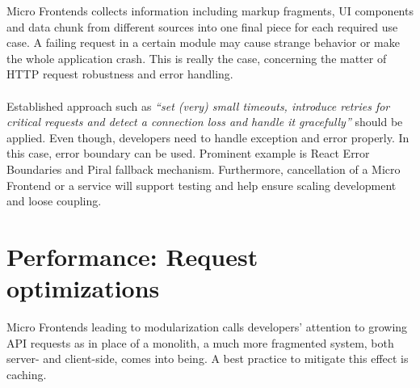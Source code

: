 \documentclass[a4paper]{book}
\begin{document}
Micro Frontends collects information including markup fragments, UI components and data chunk from different sources into one final piece for each required use case. A failing request in a certain module may cause strange behavior or make the whole application crash. This is really the case, concerning the matter of HTTP request robustness and error handling.
\\ \\
Established approach such as \textit{“set (very) small timeouts, introduce retries for critical requests and detect a connection loss and handle it gracefully”} \cite{Rap20} should be applied. Even though, developers need to handle exception and error properly. In this case, error boundary can be used. Prominent example is React Error Boundaries and Piral fallback mechanism. Furthermore, cancellation of a Micro Frontend or a service will support testing and help ensure scaling development and loose coupling.

\section{Performance: Request optimizations}
Micro Frontends leading to modularization calls developers’ attention to growing API requests as in place of a monolith, a much more fragmented system, both server- and client-side, comes into being. 
A best practice to mitigate this effect is caching. 


\end{document}
